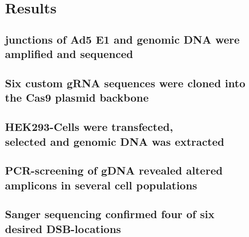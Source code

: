 \chapter{Results}

\section{junctions of Ad5 E1 and genomic DNA were amplified and sequenced}

\section{Six custom gRNA sequences were cloned into the Cas9 plasmid backbone}

\section{HEK293-Cells were transfected, \\ selected and genomic DNA was extracted}

\section{PCR-screening of gDNA revealed altered \\ amplicons in several cell populations}

\section{Sanger sequencing confirmed four of six desired DSB-locations}
